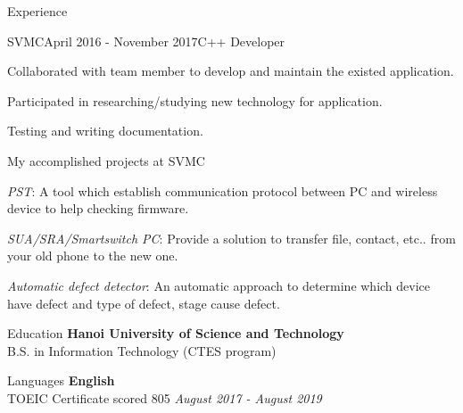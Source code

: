 \documentclass{resume}
\begin{document}
\begin{rSection}{Experience}
    \begin{rSubsection}{SVMC}{April 2016 - November 2017}{C++ Developer}{}
      \item Collaborated with team member to develop and maintain the existed application.
      \item Participated in researching/studying new technology for application.
      \item Testing and writing documentation.
    \end{rSubsection}

    \begin{rSubsection}{}{}{My accomplished projects at SVMC}{}
      \item \emph{PST}: A tool which establish communication protocol between PC and wireless device to help checking firmware.
      \item \emph{SUA/SRA/Smartswitch PC}: Provide a solution to transfer file, contact, etc.. from your old phone to the new one.
      \item \emph{Automatic defect detector}: An automatic approach to determine which device have defect and type of defect, stage cause defect.
    \end{rSubsection}
  
  \end{rSection}

  \begin{rSection}{Education}
    {\bf Hanoi University of Science and Technology} \\ 
    { B.S. in Information Technology (CTES program) } \\
  \end{rSection}

  \begin{rSection}{Languages}
    {\bf English} \\ 
    { TOEIC Certificate scored 805  } \hfill {\em August 2017 - August 2019} \\
  \end{rSection}
\end{document}
